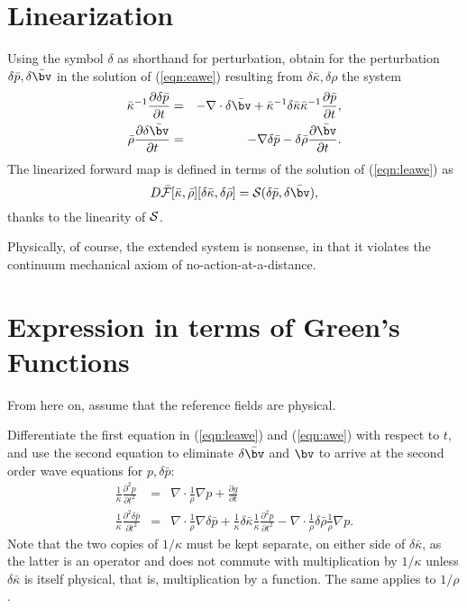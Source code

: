 \section{Linearization}
Using the symbol $\delta$ as shorthand for perturbation, obtain for the
perturbation $\delta \bar{p}, \delta \bar{\bv}$ in the solution of
(\ref{eqn:eawe}) resulting from $\delta \bar{\kappa}, \delta{\rho}$ the
system
\begin{eqnarray}
\label{eqn:leawe}
\bar{\kappa}^{-1}\frac{\partial \delta \bar{p}}{\partial t}& =& -\nabla \cdot
\delta \bar{\bv} +
\bar{\kappa}^{-1}\delta\bar{\kappa}\bar{\kappa}^{-1}\frac{\partial \bar{p}}{\partial t},\nonumber\\
\bar{\rho} \frac{\partial \delta \bar{\bv}}{\partial t} & = & -\nabla \delta
\bar{p} - \delta \bar{\rho} \frac{\partial \bar{\bv}}{\partial t}.
\end{eqnarray}
The linearized forward map is defined in terms of the solution of
(\ref{eqn:leawe}) as 
\begin{equation}
\label{eqn:leafm}
D\bar{{\cal F}}[\bar{\kappa},\bar{\rho}][\delta \bar{\kappa},\delta \bar{\rho}] =
{\cal S}(\delta \bar{p},\delta \bar{\bv}),
\end{equation}
thanks to the linearity of ${\cal S}$.

Physically, of course, the extended system is nonsense, in that it
violates the continuum mechanical axiom of
no-action-at-a-distance. 

\section{Expression in terms of Green's Functions}
From here on, assume that the reference fields are physical.

Differentiate the first equation in (\ref{eqn:leawe}) and
(\ref{eqn:awe}) with respect to $t$,
and use the second equation to eliminate $\delta \bar{\bv}$ and $\bv$ to arrive at
the second order wave equations for $p,\delta \bar{p}$:
\begin{eqnarray}
\label{eqn:awe2}
\frac{1}{\kappa}\frac{\partial^2 p}{\partial t^2} &=&
\nabla \cdot \frac{1}{\rho} \nabla p + \frac{\partial g}{\partial t}\\
\label{eqn:leawe2}
\frac{1}{\kappa}\frac{\partial^2 \delta \bar{p}}{\partial t^2} &=&
\nabla \cdot \frac{1}{\rho} \nabla \delta \bar{p} + \frac{1}{\kappa}
\delta \bar{\kappa} \frac{1}{\kappa}\frac{\partial^2 p}{\partial t^2} -
  \nabla \cdot \frac{1}{\rho}\delta \bar{\rho}\frac{1}{\rho} \nabla p. 
\end{eqnarray}
Note that the two copies of $1/\kappa$ must be kept separate, on
either side of $\delta \bar{\kappa}$, as the latter is an operator and
does not commute with multiplication by $1/\kappa$ unless $\delta
\bar{\kappa}$ is itself physical, that is, multiplication by a
function. The same applies to $1/\rho$.

